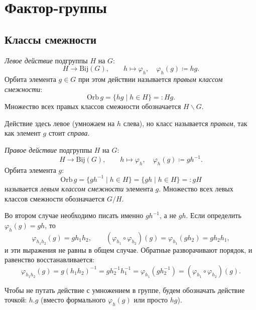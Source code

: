 \section{Фактор-группы}


\subsection*{Классы смежности}

\begin{definition}
    \emph{Левое действие} подгруппы $H$ на $G$:
    \[
        H \to \mathrm{Bij}(G), \qquad h \mapsto \varphi_h,\quad \varphi_h(g) \coloneqq hg.
    \]
    Орбита элемента $g \in G$ при этом действии называется \emph{правым классом смежности}:
    \[
        \mathrm{Orb}\, g = \{hg \mid h \in H\} =: Hg.
    \]
    Множество всех правых классов смежности обозначается $H \backslash G$.
\end{definition}

\begin{remark}
    Действие здесь левое (умножаем на $h$ слева), но класс называется \emph{правым}, так как элемент $g$ стоит \emph{справа}.
\end{remark}

\begin{definition}
    \emph{Правое действие} подгруппы $H$ на $G$:
    \[
        H \to \mathrm{Bij}(G), \qquad h \mapsto \varphi_h,\quad \varphi_h(g) \coloneqq gh^{-1}.
    \]
    Орбита элемента $g$:
    \[
        \mathrm{Orb}\, g = \{gh^{-1} \mid h \in H\} = \{gh \mid h \in H\} =: gH
    \]
    называется \emph{левым классом смежности} элемента $g$.
    Множество всех левых классов смежности обозначается $G / H$.
\end{definition}

\begin{remark}
    Во втором случае необходимо писать именно $gh^{-1}$, а не $gh$. Если определить $\varphi_h(g) = gh$, то
    \[
        \varphi_{h_1 h_2}(g) = g h_1 h_2, \qquad (\varphi_{h_1} \circ \varphi_{h_2})(g) = \varphi_{h_1} (g h_2) = g h_2 h_1,
    \]
    и эти выражения не равны в общем случае. Обратные разворачивают порядок, и равенство восстанавливается:
    \[
        \varphi_{h_1 h_2}(g) = g(h_1 h_2)^{-1} = g h_2^{-1} h_1^{-1}
        = \varphi_{h_1}(g h_2^{-1}) = (\varphi_{h_1} \circ \varphi_{h_2})(g).
    \]
\end{remark}

\begin{remark}
    Чтобы не путать действие с умножением в группе, будем обозначать действие точкой: $h . g$
    (вместо формального $\varphi_h(g)$ или просто $hg$).
\end{remark}

